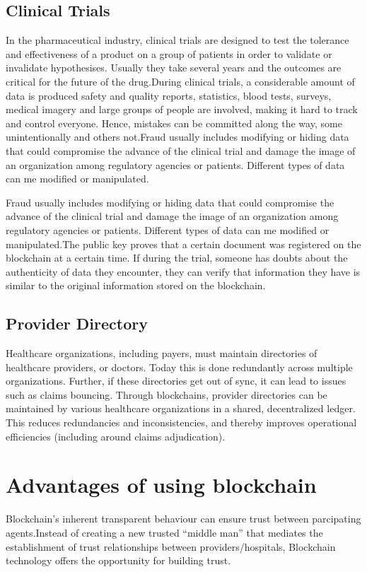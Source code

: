 \documentclass[12pt]{report}
\begin{document}
\section{Clinical Trials}
In the pharmaceutical industry, clinical trials are designed to test the tolerance and effectiveness of a product on a group of patients in order to validate or invalidate hypothesises. Usually they take several years and the outcomes are critical for the future of the drug.During clinical trials, a considerable amount of data is produced safety and quality reports, statistics, blood tests, surveys, medical imagery and large groups of people are involved, making it hard to track and control everyone\cite{17}. Hence, mistakes can be committed along the way, some unintentionally and others not.Fraud usually includes modifying or hiding data that could compromise the advance of the clinical trial and damage the image of an organization among regulatory agencies or patients. Different types of data can me modified or manipulated.
\par Fraud usually includes modifying or hiding data that could compromise the advance of the clinical trial and damage the image of an organization among regulatory agencies or patients. Different types of data can me modified or manipulated.The public key proves that a certain document was registered on the blockchain at a certain time. If during the trial, someone has doubts about the authenticity of data they encounter, they can verify that information they have is similar to the original information stored on the blockchain.

\section{Provider Directory \cite{14}}
\par Healthcare organizations, including payers, must maintain directories of healthcare providers, or doctors. Today this is done redundantly across multiple organizations. Further, if these directories get out of sync, it can lead to issues such as claims bouncing. Through blockchains, provider directories can be maintained by various healthcare organizations in a shared, decentralized ledger. This reduces redundancies and inconsistencies, and thereby improves operational efficiencies (including around claims adjudication).




\chapter{Advantages of using blockchain}
Blockchain's inherent transparent behaviour can ensure trust between parcipating agents.Instead of creating a new trusted “middle man” that mediates the establishment of
trust relationships between providers/hospitals, Blockchain technology offers the opportunity
for building trust.
\end{document}
